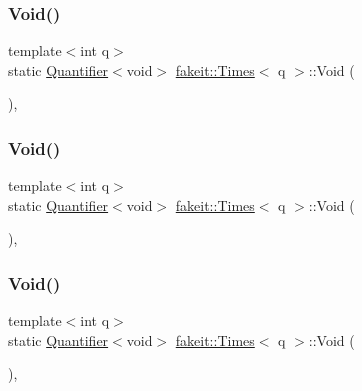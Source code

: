 \mbox{\label{structfakeit_1_1Times_ab473a1b456a5d360aff2fc5c4749ecae}} 
\subsubsection{\texorpdfstring{Void()}{Void()}\hspace{0.1cm}{\footnotesize\ttfamily [2/9]}}
{\footnotesize\ttfamily template$<$int q$>$ \\
static \mbox{\hyperlink{structfakeit_1_1Quantifier}{Quantifier}}$<$void$>$ \mbox{\hyperlink{structfakeit_1_1Times}{fakeit\+::\+Times}}$<$ q $>$\+::Void (\begin{DoxyParamCaption}{ }\end{DoxyParamCaption})\hspace{0.3cm}{\ttfamily [inline]}, {\ttfamily [static]}}

\mbox{\label{structfakeit_1_1Times_ab473a1b456a5d360aff2fc5c4749ecae}} 
\subsubsection{\texorpdfstring{Void()}{Void()}\hspace{0.1cm}{\footnotesize\ttfamily [3/9]}}
{\footnotesize\ttfamily template$<$int q$>$ \\
static \mbox{\hyperlink{structfakeit_1_1Quantifier}{Quantifier}}$<$void$>$ \mbox{\hyperlink{structfakeit_1_1Times}{fakeit\+::\+Times}}$<$ q $>$\+::Void (\begin{DoxyParamCaption}{ }\end{DoxyParamCaption})\hspace{0.3cm}{\ttfamily [inline]}, {\ttfamily [static]}}

\mbox{\label{structfakeit_1_1Times_ab473a1b456a5d360aff2fc5c4749ecae}} 
\subsubsection{\texorpdfstring{Void()}{Void()}\hspace{0.1cm}{\footnotesize\ttfamily [4/9]}}
{\footnotesize\ttfamily template$<$int q$>$ \\
static \mbox{\hyperlink{structfakeit_1_1Quantifier}{Quantifier}}$<$void$>$ \mbox{\hyperlink{structfakeit_1_1Times}{fakeit\+::\+Times}}$<$ q $>$\+::Void (\begin{DoxyParamCaption}{ }\end{DoxyParamCaption})\hspace{0.3cm}{\ttfamily [inline]}, {\ttfamily [static]}}

